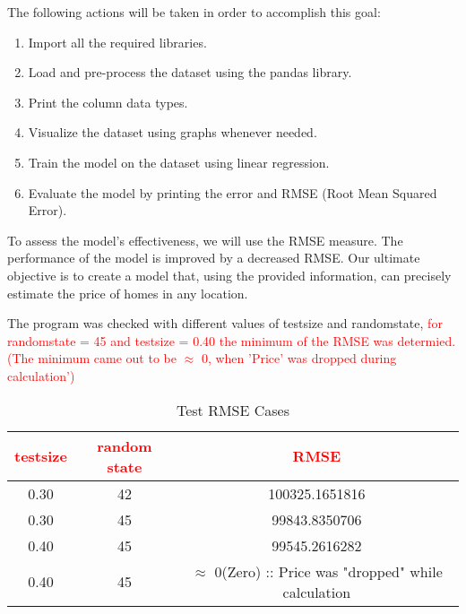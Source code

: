 \documentclass{article}
\begin{document}
\vspace{1\baselineskip}
The following actions will be taken in order to accomplish this goal:

\begin{enumerate}
\item Import all the required libraries.
\item Load and pre-process the dataset using the pandas library.
\item Print the column data types.
\item Visualize the dataset using graphs whenever needed.
\item Train the model on the dataset using linear regression.
\item Evaluate the model by printing the error and RMSE (Root Mean Squared Error).
\end{enumerate}

To assess the model's effectiveness, we will use the RMSE measure. The performance of the model is improved by a decreased RMSE. Our ultimate objective is to create a model that, using the provided information, can precisely estimate the price of homes in any location.
\vspace{1\baselineskip}

The program was checked with different values of testsize and 
randomstate, \textcolor{red}{for randomstate = 45 and testsize = 0.40 the minimum of the RMSE was determied.(The minimum came out to be 	$\approx$ 0, when 'Price' was dropped during calculation')}
\begin{table}[h]
\centering
\caption{Test RMSE Cases}
\label{tab:test-rmse}
\begin{tabular}{|c|c|c|}
\hline
\textcolor{red}{\textbf{testsize}} & \textcolor{red}{\textbf{random state}} & \textcolor{red}{\textbf{RMSE}} \\ \hline
0.30 & 42 & 100325.1651816 \\ \hline
0.30 & 45 & 99843.8350706 \\ \hline
0.40 & 45 & 99545.2616282 \\ \hline
0.40 & 45 & 	$\approx$ 0(Zero) :: Price was "dropped" while calculation \\ \hline
\end{tabular}
\end{table}


\vspace{21\baselineskip}
\end{document}
